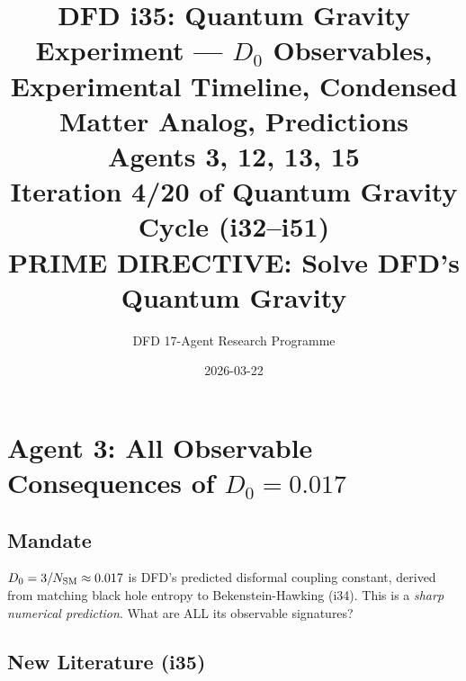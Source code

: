 \documentclass[11pt,a4paper]{article}
\title{DFD i35: Quantum Gravity Experiment --- $D_0$ Observables,\\Experimental Timeline, Condensed Matter Analog, Predictions\\[6pt]
\large Agents 3, 12, 13, 15\\[6pt]
\normalsize Iteration 4/20 of Quantum Gravity Cycle (i32--i51)\\
PRIME DIRECTIVE: Solve DFD's Quantum Gravity}
\author{DFD 17-Agent Research Programme}
\date{2026-03-22}
\begin{document}
\maketitle
\tableofcontents
\newpage

\section{Agent 3: All Observable Consequences of $D_0 = 0.017$}
\label{sec:agent3}

\subsection{Mandate}

$D_0 = 3/N_{\rm SM} \approx 0.017$ is DFD's predicted disformal coupling constant, derived from matching black hole entropy to Bekenstein-Hawking (i34). This is a \emph{sharp numerical prediction}. What are ALL its observable signatures?

\subsection{New Literature (i35)}
\end{document}
